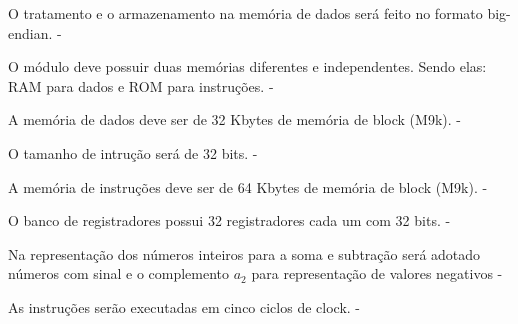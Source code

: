 \begin{nonfunctional}
	  	
        {O tratamento e o armazenamento na memória de dados será feito no formato big-endian.}
        {-}
        
		 {O módulo deve possuir duas memórias diferentes e independentes. Sendo elas: RAM para dados e ROM para instruções.}
		 {-}
        
        {A memória de dados deve ser de 32 Kbytes de memória de block (M9k).}
        {-}
       
	  {O tamanho de intrução será de 32 bits.}
	  {-}
        
        {A memória de instruções deve ser de 64 Kbytes de memória de block (M9k).}
        {-}
        
        {O banco de registradores possui 32 registradores cada um com 32 bits.}
        {-}
	  
		{Na representação dos números inteiros para a soma e subtração será adotado números com sinal e o complemento $a_{2}$ para representação de valores negativos}
		{-}
		
		{As instruções serão executadas em cinco ciclos de clock.}
		{-}		
			  
	  \end{nonfunctional}